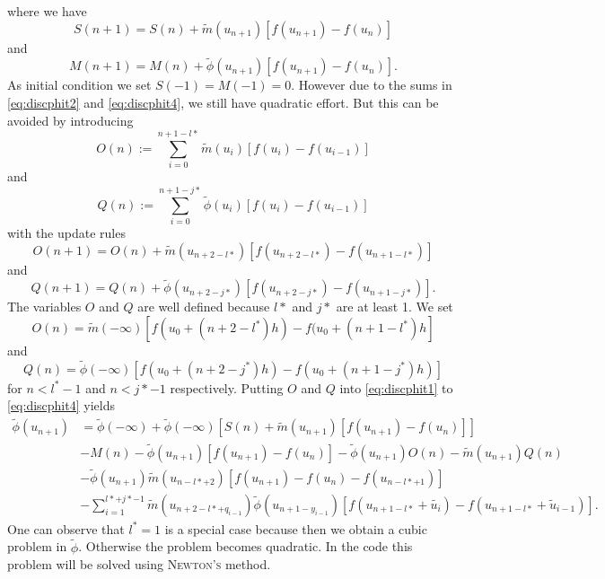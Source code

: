 \documentclass[12pt,a4paper,twoside, open=right]{scrreprt}
\theoremstyle{definition}
\theoremstyle{plain}
\begin{document}
where we have
\begin{equation}
    S(n+1) = S(n)+\tilde{m}(u_{n+1})[f(u_{n+1})-f(u_n)]
\end{equation}
and 
\begin{equation}
    M(n+1) = M(n) + \tilde\phi(u_{n+1})[f(u_{n+1})-f(u_{n})].
\end{equation}
As initial condition we set $S(-1)=M(-1)=0$. However due to the sums in \eqref{eq:discphit2} and \eqref{eq:discphit4}, we still have quadratic effort. But this can be avoided by introducing 
\begin{equation}
    O(n):=\sum_{i=0}^{n+1-l*}\tilde{m}(u_i)[f(u_i)-f(u_{i-1})]
\end{equation}
and 
\begin{equation}
    Q(n):=\sum_{i=0}^{n+1-j*}\tilde\phi(u_{i})[f(u_i)-f(u_{i-1})]
\end{equation}
with the update rules
\begin{equation}
O(n+1) = O(n)+\tilde{m}(u_{n+2-l*})[f(u_{n+2-l*})-f(u_{n+1-l*})]
\end{equation}
and 
\begin{equation}
Q(n+1) = Q(n) + \tilde\phi(u_{n+2-j*})[f(u_{n+2-j*})-f(u_{n+1-j*})].
\end{equation}
The variables $O$ and $Q$ are well defined because $l*$ and $j*$ are at least 1. 
We set 
\begin{equation}
    O(n)= \tilde{m}(-\infty)[f(u_0+(n+2-l^*)h)-f(u_0+(n+1-l^*)h]
\end{equation}
and 
\begin{equation}
Q(n)= \tilde{\phi}(-\infty)[f(u_0+(n+2-j^*)h)-f(u_0+(n+1-j^*)h)]
\end{equation}
for $n<l^*-1$ and $n<j*-1$ respectively.
Putting $O$ and $Q$ into \eqref{eq:discphit1} to \eqref{eq:discphit4} yields
\begin{align}
    \tilde\phi(u_{n+1})&=\tilde\phi(-\infty) +\tilde\phi(-\infty)[S(n)+\tilde{m}(u_{n+1})[f(u_{n+1})-f(u_n)]]\\&-M(n) -\tilde\phi(u_{n+1})[f(u_{n+1})-f(u_{n})] -\tilde{\phi}(u_{n+1})O(n)-\tilde{m}(u_{n+1})Q(n)\\&-\tilde\phi(u_{n+1})\tilde{m}(u_{n-l*+2})[f(u_{n+1})-f(u_n)-f(u_{n-l*+1})] \\&-\sum_{i=1}^{l*+j*-1}\tilde{m}(u_{n+2-l*+q_{i-1}})\tilde{\phi}(u_{n+1-y_{i-1}})[f(u_{n+1-l*}+\tilde{u_i})-f(u_{n+1-l*}+\tilde{u}_{i-1})].
\end{align}
One can observe that $l^*=1$ is a special case because then we obtain a cubic problem in $\tilde\phi$. Otherwise the problem becomes quadratic. In the code this problem will be solved using \textsc{Newton's} method.
\end{document}
